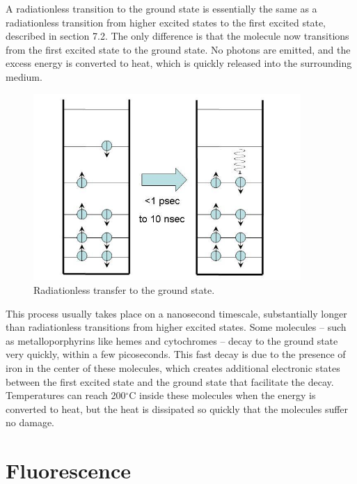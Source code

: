 A radiationless transition to the ground state is essentially the same as a radiationless transition from higher excited states to the first excited state, described in section 7.2.  The only difference is that the molecule now transitions from the first excited state to the ground state.  No photons are emitted, and the excess energy is converted to heat, which is quickly released into the surrounding medium. 
\begin{figure}[h]
	\centering
	\includegraphics[width=4.0in]{./figures/Topic7/Fig7-2.jpg}
	\caption{Radiationless transfer to the ground state.}
	\label{Fig7-2}
\end{figure}
This process usually takes place on a nanosecond timescale, substantially longer than radiationless transitions from higher excited states.  Some molecules -- such as metalloporphyrins like hemes and cytochromes -- decay to the ground state very quickly, within a few picoseconds.  This fast decay is due to the presence of iron in the center of these molecules, which creates additional electronic states between the first excited state and the ground state that facilitate the decay.  Temperatures can reach 200$^{\circ}$C inside these molecules when the energy is converted to heat, but the heat is dissipated so quickly that the molecules suffer no damage.

\section{Fluorescence}

